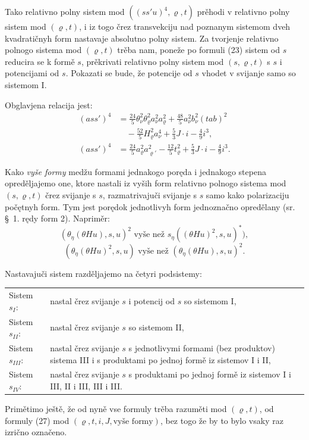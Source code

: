 \documentclass[11pt]{article}
\begin{document}
Tako relativno polny sistem mod $((ss'u)^4,\varrho,t)$ prěhodi v relativno polny sistem mod $(\varrho,t)$, i iz togo črez transvekciju nad poznanym sistemom dveh kvadratičnyh form nastavaje absolutno polny sistem. Za tvorjenje relativno polnogo sistema mod $(\varrho,t)$ trěba nam, poneže po formuli (23) sistem od $s$ reducira se k formě $s$, prěkrivati relativno polny sistem mod $(s,\varrho,t)$ s $s$ i potencijami od $s$. Pokazati se bude, že potencije od $s$ vhodet v svijanje samo so sistemom I.

Obglavjena relacija jest:
\[
\tag{22}
\begin{aligned}
(ass')^4&=\frac{24}{5}\theta_\nu^2\theta_\varrho^2a_\nu^2a_\varrho^2+
\frac{48}{5}a_\nu^2b_\nu^2(tab)^2\\
&\quad-\frac{52}{5}H_\varrho^2a_\nu^4+
\frac53J\cdot i-\frac49i^3,\\
(ass')^4&=\frac{24}{5}a_\varrho^2a_{\varrho'}^2-
\frac{12}{5}t_\varrho^2+\frac53J\cdot i-\frac49i^3.
\end{aligned}
\]

Kako \emph{vyše formy} medžu formami jednakogo poręda i jednakogo stepena opreděljajemo one, ktore nastali iz vyših form relativno polnogo sistema mod $(s,\varrho,t)$ črez svijanje s $s$, razmatrivajuči svijanje s $s$ samo kako polarizaciju počętnyh form. Tym jest porędok jednotlivyh form jednoznačno opredělany (sr. \S\ 1. rędy form 2). Napriměr:
\[
(\theta_\eta(\theta Hu),s,u)^2\text{ vyše než }s_\eta((\theta Hu)^2,s,u)^*),
\]
\[
(\theta_\eta(\theta Hu)^2,s,u)\text{ vyše než }(\theta_\eta(\theta Hu),s,u)^2.
\]

Nastavajuči sistem razděljajemo na četyri podsistemy:

\noindent\begin{tabular}{@{}l p{}@{}}
Sistem $s_I$: & nastal črez svijanje $s$ i potencij od $s$ so sistemom I,\\
Sistem $s_{II}$: & nastal črez svijanje $s$ so sistemom II,\\
Sistem $s_{III}$: & nastal črez svijanje $s$ s jednotlivymi formami (bez produktov) sistema III i s produktami po jednoj formě iz sistemov I i II,\\
Sistem $s_{IV}$: & nastal črez svijanje $s$ s produktami po jednoj formě iz sistemov I i III, II i III, III i III.
\end{tabular}

\medskip

Primětimo ještě, že od nyně vse formuly trěba razuměti mod $(\varrho,t)$, od formuly (27) mod $(\varrho,t,i,J,\text{vyše formy})$, bez togo že by to bylo vsaky raz izrično označeno.
\end{document}

